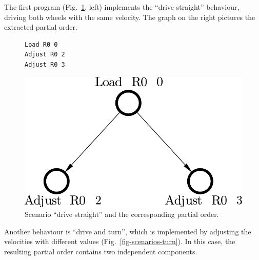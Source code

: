 The first program (Fig.~\ref{fig-scenarios-drive-straight}, left) implements
the ``drive straight'' behaviour, driving both wheels with the same velocity.
The graph on the right pictures the extracted partial order.

\begin{figure}[H]
\centering
\begin{minipage}[b]{0.5\textwidth}
\begin{verbatim}
Load R0 0
Adjust R0 2
Adjust R0 3
\end{verbatim}
\vspace{5mm}
\end{minipage}
\begin{minipage}[b]{0.4\textwidth}
\includegraphics[scale=0.35]{img/ataed-scenario-drive-straight.pdf}
\end{minipage}
\vspace{-3mm}
\caption{Scenario ``drive straight'' and the corresponding
partial order.\label{fig-scenarios-drive-straight}}
\vspace{-7mm}
\end{figure}

Another behaviour is ``drive and turn'', which is implemented by adjusting the
velocities with different values (Fig.~\ref{fig-scenarios-turn}). In this case,
the resulting partial order contains two independent components.

